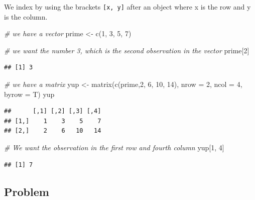\documentclass[
]{book}
\newenvironment{Shaded}{\begin{snugshade}}{\end{snugshade}}
\newcommand{\AttributeTok}[1]{\textcolor[rgb]{0.77,0.63,0.00}{#1}}
\newcommand{\CommentTok}[1]{\textcolor[rgb]{0.56,0.35,0.01}{\textit{#1}}}
\newcommand{\DecValTok}[1]{\textcolor[rgb]{0.00,0.00,0.81}{#1}}
\newcommand{\FunctionTok}[1]{\textcolor[rgb]{0.00,0.00,0.00}{#1}}
\newcommand{\NormalTok}[1]{#1}
\newcommand{\OtherTok}[1]{\textcolor[rgb]{0.56,0.35,0.01}{#1}}
\begin{document}
We index by using the brackets \texttt{{[}x,\ y{]}} after an object where x is the row and y is the column.

\begin{Shaded}
\begin{Highlighting}[]
\CommentTok{\# we have a vector}
\NormalTok{prime }\OtherTok{\textless{}{-}} \FunctionTok{c}\NormalTok{(}\DecValTok{1}\NormalTok{, }\DecValTok{3}\NormalTok{, }\DecValTok{5}\NormalTok{, }\DecValTok{7}\NormalTok{)}

\CommentTok{\# we want the number 3, which is the second observation in the vector}
\NormalTok{prime[}\DecValTok{2}\NormalTok{]}
\end{Highlighting}
\end{Shaded}

\begin{verbatim}
## [1] 3
\end{verbatim}

\begin{Shaded}
\begin{Highlighting}[]
\CommentTok{\# we have a matrix}
\NormalTok{yup }\OtherTok{\textless{}{-}} \FunctionTok{matrix}\NormalTok{(}\FunctionTok{c}\NormalTok{(prime,}\DecValTok{2}\NormalTok{, }\DecValTok{6}\NormalTok{, }\DecValTok{10}\NormalTok{, }\DecValTok{14}\NormalTok{), }\AttributeTok{nrow =} \DecValTok{2}\NormalTok{, }\AttributeTok{ncol =} \DecValTok{4}\NormalTok{, }\AttributeTok{byrow =}\NormalTok{ T)}
\NormalTok{yup}
\end{Highlighting}
\end{Shaded}

\begin{verbatim}
##      [,1] [,2] [,3] [,4]
## [1,]    1    3    5    7
## [2,]    2    6   10   14
\end{verbatim}

\begin{Shaded}
\begin{Highlighting}[]
\CommentTok{\# We want the observation in the first row and fourth column}
\NormalTok{yup[}\DecValTok{1}\NormalTok{, }\DecValTok{4}\NormalTok{]}
\end{Highlighting}
\end{Shaded}

\begin{verbatim}
## [1] 7
\end{verbatim}

\hypertarget{problem-4}{%
\subsection{Problem}\label{problem-4}}
\end{document}
